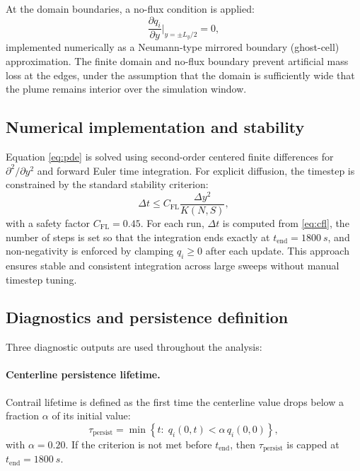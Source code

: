 \documentclass[11pt]{article}
\begin{document}
At the domain boundaries, a no-flux condition is applied:
\begin{equation}
\frac{\partial q_i}{\partial y}\bigg|_{y=\pm L_y/2}=0,
\label{eq:bc}
\end{equation}
implemented numerically as a Neumann-type mirrored boundary (ghost-cell) approximation. The finite
domain and no-flux boundary prevent artificial mass loss at the edges, under the assumption that the
domain is sufficiently wide that the plume remains interior over the simulation window.

\subsection{Numerical implementation and stability}
\label{sec:matlab_numerics}

Equation \eqref{eq:pde} is solved using second-order centered finite differences for $\partial^2/\partial y^2$
and forward Euler time integration. For explicit diffusion, the timestep is constrained by the standard
stability criterion\cite{Fischer1979}:
\begin{equation}
\Delta t \le C_{\mathrm{FL}}\frac{\Delta y^2}{K(N,S)},
\label{eq:cfl}
\end{equation}
with a safety factor $C_{\mathrm{FL}}=0.45$. For each run, $\Delta t$ is computed from \eqref{eq:cfl}, the number
of steps is set so that the integration ends exactly at $t_{\mathrm{end}}=1800~\si{s}$, and non-negativity is enforced
by clamping $q_i\ge 0$ after each update. This approach ensures stable and consistent integration across large sweeps
without manual timestep tuning.

\subsection{Diagnostics and persistence definition}
\label{sec:matlab_diagnostics}

Three diagnostic outputs are used throughout the analysis:

\paragraph{Centerline persistence lifetime.}
Contrail lifetime is defined as the first time the centerline value drops below a fraction $\alpha$ of its initial
value:
\begin{equation}
\tau_{\mathrm{persist}}=\min\left\{t:\;q_i(0,t) < \alpha\,q_i(0,0)\right\},
\label{eq:tau_def}
\end{equation}
with $\alpha=0.20$. If the criterion is not met before $t_{\mathrm{end}}$, then $\tau_{\mathrm{persist}}$ is capped at
$t_{\mathrm{end}}=1800~\si{s}$.
\end{document}
